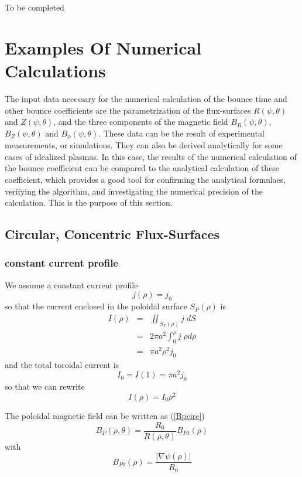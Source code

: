 \documentclass{article}
\begin{document}
To be completed

\section{Examples Of Numerical Calculations}

The input data necessary for the numerical calculation of the bounce time
and other bounce coefficients are the parametrization of the flux-surfaces $%
R\left( \psi ,\theta \right) $ and $Z\left( \psi ,\theta \right) $, and the
three components of the magnetic field $B_{R}\left( \psi ,\theta \right) $, $%
B_{Z}\left( \psi ,\theta \right) $ and $B_{\phi }\left( \psi ,\theta \right) 
$. These data can be the result of experimental measurements, or
simulations. They can also be derived analytically for some cases of
idealized plasmas. In this case, the results of the numerical calculation of
the bounce coefficient can be compared to the analytical calculation of
these coefficient, which provides a good tool for confirming the analytical
formulaes, verifying the algorithm, and investigating the numerical
precision of the calculation. This is the purpose of this section.

\subsection{Circular, Concentric Flux-Surfaces}

\subsubsection{constant current profile}

We assume a constant current profile 
\[
j\left( \rho \right) =j_{0} 
\]
so that the current enclosed in the poloidal surface $S_{P}\left( \rho
\right) $ is 
\begin{eqnarray*}
I\left( \rho \right) &=&\iint_{S_{P}\left( \rho \right) }j\;dS \\
&=&2\pi a^{2}\int_{0}^{\rho }j\;\rho d\rho \\
&=&\pi a^{2}\rho ^{2}j_{0}
\end{eqnarray*}
and the total toroidal current is 
\[
I_{0}=I\left( 1\right) =\pi a^{2}j_{0} 
\]
so that we can rewrite 
\[
I\left( \rho \right) =I_{0}\rho ^{2} 
\]

The poloidal magnetic field can be written as (\ref{Bpcirc}) 
\[
B_{P}\left( \rho ,\theta \right) =\frac{R_{0}}{R\left( \rho ,\theta \right) }%
B_{P0}\left( \rho \right) 
\]
with 
\begin{equation}
B_{P0}\left( \rho \right) =\frac{\left| \nabla \psi \left( \rho \right)
\right| }{R_{0}}
\end{equation}
\end{document}
